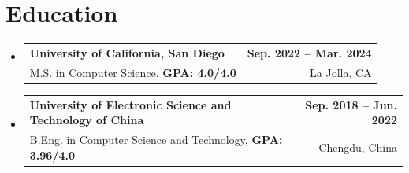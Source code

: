 \documentclass[letterpaper,11pt]{article}
\makeatletter
\newcommand{\resumeItem}[1]{
  \item\small{
    {#1 \vspace{-2pt}}
  }
}
\newcommand{\resumeSubheading}[4]{
  \vspace{-2pt}\item
    \begin{tabular*}{1.0\textwidth}[t]{l@{\extracolsep{\fill}}r}
      \textbf{#1} & \textbf{\small #2} \\
      {\small#3} & {\small #4} \\
    \end{tabular*}\vspace{-7pt}
}
\newcommand{\resumeSubHeadingListStart}{\begin{itemize}[leftmargin=0.0in, label={}]}
\newcommand{\resumeSubHeadingListEnd}{\end{itemize}}
\newcommand{\resumeItemListStart}{\begin{itemize}}
\newcommand{\resumeItemListEnd}{\end{itemize}\vspace{-5pt}}
\makeatother
\begin{document}
\section{Education}
\resumeSubHeadingListStart
\resumeSubheading
{University of California, San Diego}{Sep. 2022 -- Mar. 2024}
{M.S. in Computer Science, \textbf{GPA: 4.0/4.0}}{La Jolla, CA}



\resumeSubheading
{University of Electronic Science and Technology of China}{Sep. 2018 -- Jun. 2022}
{B.Eng. in Computer Science and Technology, \textbf{GPA: 3.96/4.0}}{Chengdu, China}


\resumeSubHeadingListEnd


\end{document}
